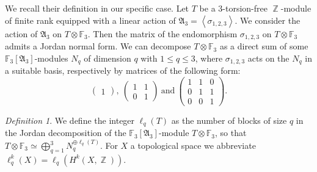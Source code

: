 \documentclass[a4paper]{article}
\theoremstyle{remark}
\newtheorem{defi}{Definition}
\DeclareMathOperator{\Z}{\mathbb{Z}}
\DeclareMathOperator{\F}{\mathbb{F}_{p}}
\begin{document}
We recall their definition in our specific case. Let $T$ be a $3$-torsion-free $\Z$-module of finite rank equipped with a linear action of $\mathfrak{A}_3=\left\langle \sigma_{1,2,3}\right\rangle$. 
We consider the action of $\mathfrak{A}_3$ on $T\otimes\mathbb{F}_3$. Then the matrix of the endomorphism $\sigma_{1,2,3}$ on $T\otimes\mathbb{F}_3$ admits a Jordan normal form.  
We can decompose $T\otimes\mathbb{F}_3$ as a direct sum of some $\mathbb{F}_3[\mathfrak{A}_3]$-modules $N_{q}$ of dimension $q$ with $1\leq q\leq 3$, where $\sigma_{1,2,3}$ acts on the $N_{q}$ in a suitable basis, respectively by matrices of the following form:
$$\begin{pmatrix}
1\end{pmatrix},\ 
\begin{pmatrix}
1 & 1\\
0 & 1
\end{pmatrix}\
\text{and}\
\begin{pmatrix}
1 & 1 & 0\\
0 & 1 & 1\\
0 & 0 & 1
\end{pmatrix}.
$$
\begin{defi}
We define the integer $\ell_{q}(T)$ as the number of blocks of size $q$ in the Jordan decomposition of the $\mathbb{F}_3[\mathfrak{A}_3]$-module $T\otimes\mathbb{F}_3$, so that $T\otimes\mathbb{F}_3\simeq \bigoplus_{q=1}^{3} N_{q}^{\oplus \ell_{q}(T)}$.
For $X$ a topological space we abbreviate
$ \ell_q^k(X)=\ell_q(H^k(X,\Z))$.
\end{defi}
\end{document}
